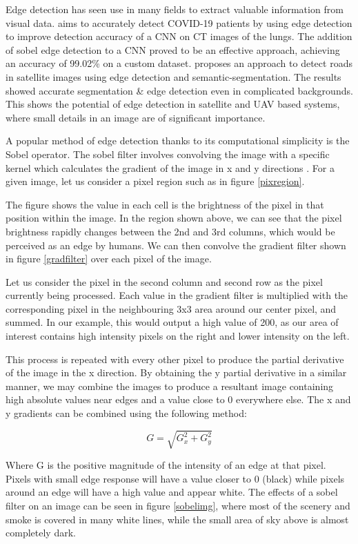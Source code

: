 \documentclass[lettersize,journal]{IEEEtran}
\begin{document}
Edge detection has seen use in many fields to extract valuable
information from visual data. \cite{covidsobel} aims to accurately detect
COVID-19 patients by using edge detection to improve detection accuracy
of a CNN on CT images of the lungs. The addition of sobel edge detection
to a CNN proved to be an effective approach, achieving an accuracy of
99.02\% on a custom dataset. \cite{edgesat} proposes an approach to
detect roads in satellite images using edge detection and
semantic-segmentation. The results showed accurate segmentation \& edge
detection even in complicated backgrounds. This shows the potential of
edge detection in satellite and UAV based systems, where small details
in an image are of significant importance.

A popular method of edge detection thanks to its computational
simplicity is the Sobel operator. The sobel filter involves convolving
the image with a specific kernel which calculates the gradient of the
image in x and y directions \cite{sobel}. For a given image, let us
consider a pixel region such as in figure \ref{pixregion}.

The figure shows the value in each cell is the brightness of the pixel in that
position within the image. In the region shown above, we can see that
the pixel brightness rapidly changes between the 2nd and 3rd columns,
which would be perceived as an edge by humans. We can then convolve the
gradient filter shown in figure \ref{gradfilter} over each pixel of the image.

Let us consider the pixel in the second column and second row as the
pixel currently being processed. Each value in the gradient filter is
multiplied with the corresponding pixel in the neighbouring 3x3 area
around our center pixel, and summed. In our example, this would output a
high value of 200, as our area of interest contains high intensity
pixels on the right and lower intensity on the left.

This process is repeated with every other pixel to produce the partial
derivative of the image in the x direction. By obtaining the y partial
derivative in a similar manner, we may combine the images to produce a
resultant image containing high absolute values near edges and a value
close to 0 everywhere else. The x and y gradients can be combined using
the following method:

\[G = \sqrt{G_{x}^{2} + G_{y}^{2}}\]

Where G is the positive magnitude of the intensity of an edge at that
pixel. Pixels with small edge response will have a value closer to 0
(black) while pixels around an edge will have a high value and appear
white. The effects of a sobel filter on an image can be seen in figure
\ref{sobelimg}, where most of the scenery and smoke
is covered in many white lines, while the small area of sky above is
almost completely dark.
\end{document}
